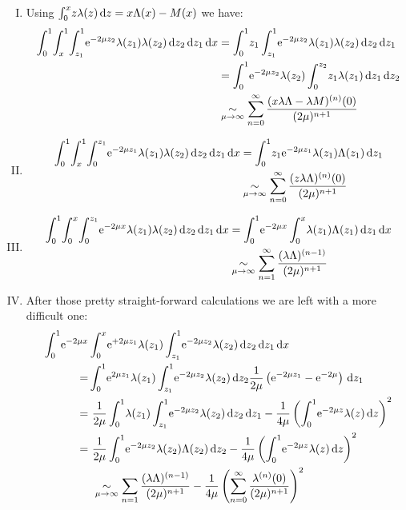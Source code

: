 \begin{enumerate}[(I)]
  \item Using $\Integ[x]{0}{z}{z\lambda(z)} = x\Lambda(x) - M(x)$ we have:
    \begin{align*}
      \Int{x}{
        \Integ[1]{x}{z_1}{\Integ[1]{z_1}{z_2}{
            \Eto{-2\mu z_2}\lambda(z_1)\lambda(z_2)
          }
        }
      }
      &= \Int{z_1}{z_1 \Integ[1]{z_1}{z_2}{\Eto{-2\mu z_2}\lambda(z_1)\lambda(z_2)}}
      \\
      &= \Int{z_2}{\Eto{-2\mu z_2}\lambda(z_2) \Integ[z_2]{0}{z_1}{z_1\lambda(z_1)}}
      \\
      &\SimMu \Wsum{(x\lambda\Lambda - \lambda M)^{(n)}}
    \end{align*}

  \item
    \begin{align*}
      \Int{x}{
        \Integ[1]{x}{z_1}{
          \Integ[z_1]{0}{z_2}{
            \Eto{-2\mu z_1}{\lambda(z_1)\lambda(z_2)}
          }
        }
      }
      &= \Int{z_1}{z_1 \Eto{-2\mu z_1}\lambda(z_1)\Lambda(z_1)} \\
      &\SimMu \Wsum{(z\lambda\Lambda)^{(n)}}
    \end{align*}

  \item
    \begin{align*}
      \Int{x}{
        \Integ[x]{0}{z_1}{
          \Integ[z_1]{0}{z_2}{
            \Eto{-2\mu x}\lambda(z_1)\lambda(z_2)
          }
        }
      }
      &= \Int{x}{
        \Eto{-2\mu x} \Integ[x]{0}{z_1}{\lambda(z_1)\Lambda(z_1)}
      } \\
      &\SimMu \sum_{n=1}^\infty \frac{(\lambda\Lambda)^{(n-1)}}{(2\mu)^{n+1}}
    \end{align*}

  \item After those pretty straight-forward calculations we are left with a more
    difficult one:
    \begin{align*}
      \Int{x}{
        \Eto{-2\mu x}
        &\Integ[x]{0}{z_1}{
          \Eto{+2\mu z_1} \lambda(z_1)
          \Integ[1]{z_1}{z_2}{
            \Eto{-2\mu z_2} \lambda(z_2)
          }
        }
      } \\
      =&\Int{z_1}{
        \Eto{2\mu z_1}\lambda(z_1)
        \Integ[1]{z_1}{z_2}{
          \Eto{-2\mu z_2}\lambda(z_2)
        }
        \frac{1}{2\mu}\left(\Eto{-2\mu z_1} - \Eto{-2\mu}\right)
      } \\
      =&\ \frac{1}{2\mu}
        \Int{z_1}{
          \lambda(z_1)
          \Integ[1]{z_1}{z_2}{
            \Eto{-2\mu z_2}\lambda(z_2)
          }
        }
        -\frac{1}{4\mu}
        \left(\Int{z}{\Eto{-2\mu z}\lambda(z)}\right)^{2}
        \\
        =&\ \frac{1}{2\mu} \Int{z_2}{\Eto{-2\mu z_2}\lambda(z_2)\Lambda(z_2)}
        -\frac1{4\mu}\left(\Int{z}{\Eto{-2\mu z}\lambda(z)}\right)^{2}
        \\
        &\ \SimMu \sum_{n=1}\frac{(\lambda \Lambda)^{(n-1)}}{(2\mu)^{n+1}}
              -\frac{1}{4\mu}\left(\Wsum{\lambda^{(n)}}\right)^2
    \end{align*}
\end{enumerate}
